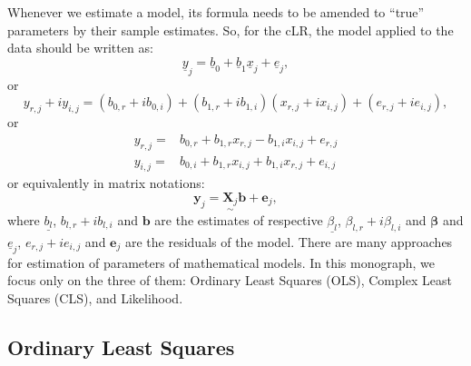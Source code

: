 \documentclass[
]{book}
\begin{document}
Whenever we estimate a model, its formula needs to be amended to ``true'' parameters by their sample estimates. So, for the cLR, the model applied to the data should be written as:
\begin{equation}
    \underline{y}_j = \underline{b}_0 + \underline{b}_1 \underline{x}_j + \underline{e}_j,
    \label{eq:SimpleCLRComplexEstimated}
\end{equation}
or
\begin{equation}
    y_{r,j}+i y_{i,j} = (b_{0,r} + i b_{0,i}) + (b_{1,r} + i b_{1,i}) (x_{r,j}+i x_{i,j}) + (e_{r,j} + i e_{i,j}),
    \label{eq:SimpleCLREstimated}
\end{equation}
or
\begin{equation}
    \begin{aligned}
        y_{r,j} = & b_{0,r} + b_{1,r} x_{r,j} - b_{1,i} x_{i,j} + e_{r,j} \\
        y_{i,j} = & b_{0,i} + b_{1,r} x_{i,j} + b_{1,i} x_{r,j} + e_{i,j}
    \end{aligned}
    \label{eq:SimpleCLRSystemEstimated}
\end{equation}
or equivalently in matrix notations:
\begin{equation}
    \mathbf{y}_j = \underset{\sim}{\mathbf{X}_j} \boldsymbol{b} + \boldsymbol{e}_j ,
    \label{eq:SimpleCLRSystemVector03Estimated}
\end{equation}
where \(\underline{b_{l}}\), \(b_{l,r}+ib_{l,i}\) and \(\boldsymbol{b}\) are the estimates of respective \(\underline{\beta_l}\), \(\beta_{l,r} + i \beta_{l,i}\) and \(\boldsymbol{\beta}\) and \(\underline{e}_j\), \(e_{r,j} + i e_{i,j}\) and \(\boldsymbol{e}_j\) are the residuals of the model. There are many approaches for estimation of parameters of mathematical models. In this monograph, we focus only on the three of them: Ordinary Least Squares (OLS), Complex Least Squares (CLS), and Likelihood.

\hypertarget{SCLREstimationOLS}{%
\subsection{Ordinary Least Squares}\label{SCLREstimationOLS}}
\end{document}
